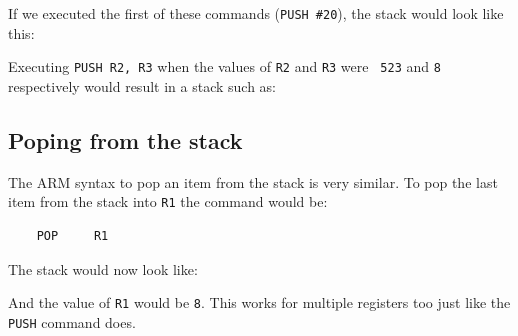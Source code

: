 If we executed the first of these commands ({\tt PUSH \#20}), the stack would
look like this:

\begin{center}
\begin{drawstack}
		
		
		
		
		
\end{drawstack}
\end{center}

Executing {\tt PUSH R2, R3} when the values of {\tt R2} and {\tt R3} were {\tt
523} and {\tt 8} respectively would result in a stack such as:

\begin{center}
\begin{drawstack}
		
		
		
		
		
\end{drawstack}
\end{center}

\subsection{Poping from the stack}

The ARM syntax to pop an item from the stack is very similar. To pop the last
item from the stack into {\tt R1} the command would be:

\begin{verbatim}
	POP 	R1
\end{verbatim}

The stack would now look like:

\begin{center}
\begin{drawstack}
		
		
		
		
		
\end{drawstack}
\end{center}


And the value of {\tt R1} would be {\tt 8}. This works for multiple registers
too just like the {\tt PUSH} command does.

